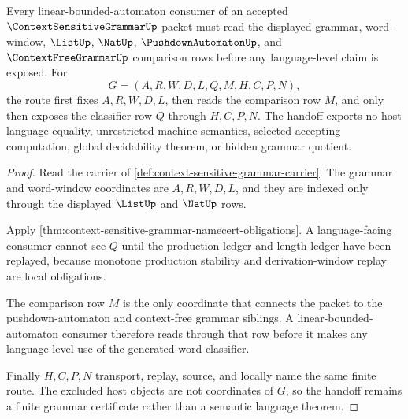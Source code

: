 \begin{theorem}
\label{thm:context-sensitive-grammar-linear-bounded-handoff}
Every linear-bounded-automaton consumer of an accepted $\ContextSensitiveGrammarUp$ packet must read the displayed grammar, word-window, $\ListUp$, $\NatUp$, $\PushdownAutomatonUp$, and $\ContextFreeGrammarUp$ comparison rows before any language-level claim is exposed. For
$$
G=(A,R,W,D,L,Q,M,H,C,P,N),
$$
the route first fixes $A,R,W,D,L$, then reads the comparison row $M$, and only then exposes the classifier row $Q$ through $H,C,P,N$. The handoff exports no host language equality, unrestricted machine semantics, selected accepting computation, global decidability theorem, or hidden grammar quotient.
\end{theorem}
\begin{proof}
Read the carrier of \autoref{def:context-sensitive-grammar-carrier}. The grammar and word-window coordinates are $A,R,W,D,L$, and they are indexed only through the displayed $\ListUp$ and $\NatUp$ rows.

Apply \autoref{thm:context-sensitive-grammar-namecert-obligations}. A language-facing consumer cannot see $Q$ until the production ledger and length ledger have been replayed, because monotone production stability and derivation-window replay are local obligations.

The comparison row $M$ is the only coordinate that connects the packet to the pushdown-automaton and context-free grammar siblings. A linear-bounded-automaton consumer therefore reads through that row before it makes any language-level use of the generated-word classifier.

Finally $H,C,P,N$ transport, replay, source, and locally name the same finite route. The excluded host objects are not coordinates of $G$, so the handoff remains a finite grammar certificate rather than a semantic language theorem.
\end{proof}


